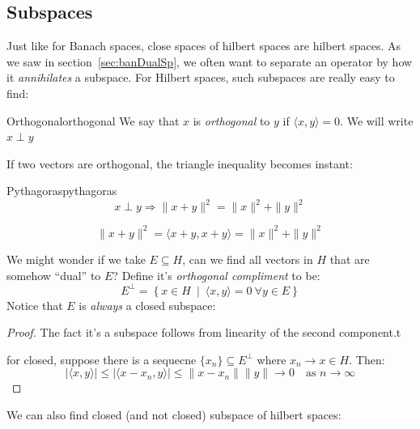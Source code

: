 \documentclass[oneside]{book}
\newcommand{\sse}{\subseteq}
\newcommand{\rw}{\rightarrow}
\newcommand{\Rw}{\Rightarrow}
\newcommand{\set}[2]{\left\{#1 \ \middle|\ #2\right\}}
\begin{document}
\subsection*{Subspaces}

Just like for Banach spaces, close spaces of hilbert spaces are hilbert spaces. As we saw in
section~\ref{sec:banDualSp}, we often want to separate an operator by how it \emph{annihilates} a subspace. For Hilbert
spaces, such subspaces are really easy to find:

\begin{defn}{Orthogonal}{orthogonal}
We say that $x$ is \emph{orthogonal} to $y$ if $ \langle x,y \rangle = 0$. We will write $x \perp y$
\end{defn}

If two vectors are orthogonal, the triangle inequality becomes instant:

\begin{thm}{Pythagoras}{pythagoras}
\[
	x\perp y \Rw \|x+y\|^2 = \|x\|^2 + \|y\|^2
\]
\end{thm}

\begin{Proof}
\[
	\|x+y\|^2 = \langle x+y, x+y\rangle = \|x\|^2 + \|y\|^2
\]
\end{Proof}


We might wonder if we take $E \sse H$, can we find all vectors in $H$ that are somehow ``dual'' to $E$? Define it's \emph{orthogonal compliment} to be:
\[
E^\perp = \set{x \in H}{\langle x,y \rangle = 0\ \forall y \in E }
\]
Notice that $E$ is \emph{always} a closed subspace:

\begin{proof}
The fact it's a subspace follows from linearity of the second component.t

for closed, suppose there is a sequecne $\{x_n\} \sse E^\perp$ where $x_n \rw x \in H$. Then:
\[
	|\langle x,y\rangle| \le |\langle x-x_n, y\rangle| \le \|x-x_n\|\|y\| \rw 0 \quad \text{as $n \rw \infty$}
\]
\end{proof}

We can also find closed (and not closed) subspace of hilbert spaces:
\end{document}
